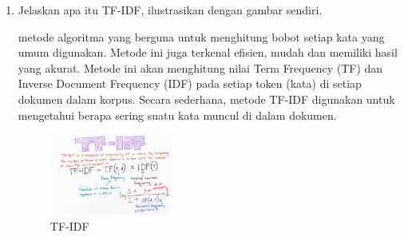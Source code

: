 \begin{enumerate}
        \item Jelaskan apa itu TF-IDF, ilustrasikan dengan gambar sendiri.
        
        metode algoritma yang berguna untuk menghitung bobot setiap kata yang umum digunakan. Metode ini juga terkenal efisien, mudah dan memiliki hasil yang akurat. Metode ini akan menghitung nilai Term Frequency (TF) dan Inverse Document Frequency (IDF) pada setiap token (kata) di setiap dokumen dalam korpus. Secara sederhana, metode TF-IDF digunakan untuk mengetahui berapa sering suatu kata muncul di dalam dokumen.
        \begin{figure}[H]
            \includegraphics[width=4cm]{figures/1174086/chapter4/tf.png}
            \centering
            \caption{TF-IDF}
        \end{figure}

    \end{enumerate}

